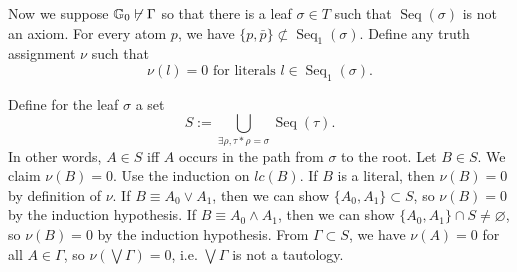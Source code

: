 \documentclass{../../small}
\DeclareMathOperator{\Seq}{Seq}
\begin{document}
\begin{pf}
Now we suppose $\mathbb{G}_0\not\vdash\Gamma$ so that there is a leaf $\sigma\in T$ such that $\Seq(\sigma)$ is not an axiom.
For every atom $p$, we have $\{p,\bar p\}\not\subset\Seq_1(\sigma)$.
Define any truth assignment $\nu$ such that
\[\nu(l)=0\text{ for literals }l\in\Seq_1(\sigma).\]

Define for the leaf $\sigma$ a set
\[S:=\bigcup_{\exists\rho,\tau*\rho=\sigma}\Seq(\tau).\]
In other words, $A\in S$ iff $A$ occurs in the path from $\sigma$ to the root.
Let $B\in S$.
We claim $\nu(B)=0$.
Use the induction on $lc(B)$.
If $B$ is a literal, then $\nu(B)=0$ by definition of $\nu$.
If $B\equiv A_0\vee A_1$, then we can show $\{A_0,A_1\}\subset S$, so $\nu(B)=0$ by the induction hypothesis.
If $B\equiv A_0\wedge A_1$, then we can show $\{A_0,A_1\}\cap S\ne\varnothing$, so $\nu(B)=0$ by the induction hypothesis.
From $\Gamma\subset S$, we have $\nu(A)=0$ for all $A\in\Gamma$, so $\nu(\bigvee\Gamma)=0$, i.e. $\bigvee\Gamma$ is not a tautology.
\end{pf}
\end{document}
